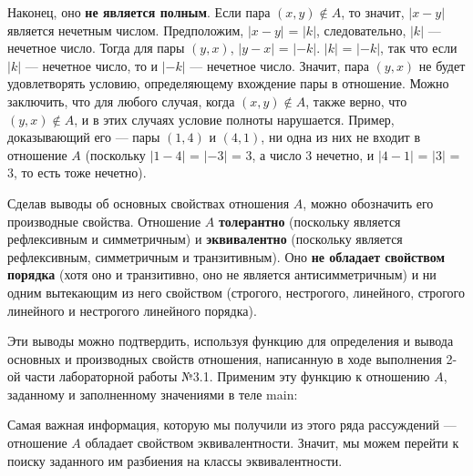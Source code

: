 \documentclass[12pt]{article}
\begin{document}
	Наконец, оно {\bf не является полным}. Если пара $(x, y) \notin A$, то значит, $|x-y|$ является нечетным числом. Предположим, $|x-y|$ = $|k|$, следовательно, $|k|$ --- нечетное число. Тогда для пары $(y, x)$, $|y-x|$ = $|-k|$. $|k|$ = $|-k|$, так что если $|k|$ --- нечетное число, то и $|-k|$ --- нечетное число. Значит, пара $(y, x)$ не будет удовлетворять условию, определяющему вхождение пары в отношение. Можно заключить, что для любого случая, когда $(x, y) \notin A$, также верно, что $(y, x) \notin A$, и в этих случаях условие полноты нарушается. Пример, доказывающий его --- пары $(1, 4)$ и $(4, 1)$, ни одна из них не входит в отношение $A$ (поскольку $|1-4|$ = $|-3|$ = $3$, а число 3 нечетно, и $|4-1|$ = $|3|$ = $3$, то есть тоже нечетно).
	
	Сделав выводы об основных свойствах отношения $A$, можно обозначить его производные свойства. Отношение $A$ {\bf толерантно} (поскольку является рефлексивным и симметричным) и {\bf эквивалентно} (поскольку является рефлексивным, симметричным и транзитивным). Оно {\bf не обладает свойством порядка} (хотя оно и транзитивно, оно не является антисимметричным) и ни одним вытекающим из него свойством (строгого, нестрогого, линейного, строгого линейного и нестрогого линейного порядка).
	
	Эти выводы можно подтвердить, используя функцию для определения и вывода основных и производных свойств отношения, написанную в ходе выполнения 2-ой части лабораторной работы №3.1. Применим эту функцию к отношению $A$, заданному и заполненному значениями в теле main:
	
	 
	
	\begin{figure}[h]
		\noindent{}
	\end{figure}
	
	Самая важная информация, которую мы получили из этого ряда рассуждений --- отношение $A$ обладает свойством эквивалентности. Значит, мы можем перейти к поиску заданного им разбиения на классы эквивалентности.
\end{document}
